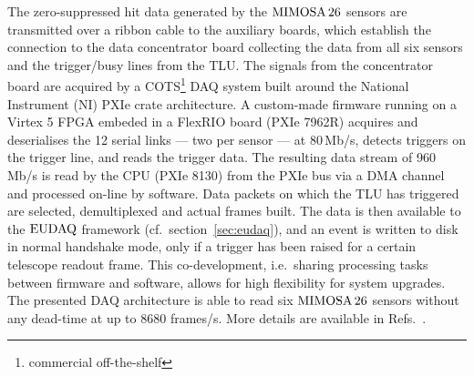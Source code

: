 The zero-suppressed hit data generated by the $\textrm{MIMOSA\,26}$ sensors are transmitted over a ribbon cable to the auxiliary boards,
 which establish the connection to the data concentrator board collecting the data from all six sensors and the trigger/busy lines from the TLU.
The signals from the concentrator board are acquired by a COTS\footnote{commercial off-the-shelf} DAQ system built around the National Instrument (NI) PXIe crate architecture. 
A custom-made firmware running on a Virtex 5 FPGA embeded in a FlexRIO board (PXIe 7962R) acquires and deserialises the 12 serial links --- two per sensor --- at 80\,Mb/s,
 detects triggers on the trigger line, and reads the trigger data. 
The resulting data stream of 960 Mb/s is read by the CPU (PXIe 8130) from the PXIe bus via a DMA channel and processed on-line by software. 
Data packets on which the TLU has triggered are selected, demultiplexed and actual frames built. 
The data is then available to the $\textrm{EUDAQ}$ framework (cf.\ section~\ref{sec:eudaq}), and an event is written to disk in normal handshake mode, only if a trigger has been raised for a certain telescope readout frame. 
This co-development, i.e.\ sharing processing tasks between firmware and software, allows for high flexibility for system upgrades. 
The presented DAQ architecture is able to read six $\textrm{MIMOSA\,26}$ sensors without any dead-time at up to 8680 frames/s.
More details are available in Refs.~\cite{EUDET-2010-25,Claus}.
 
 
